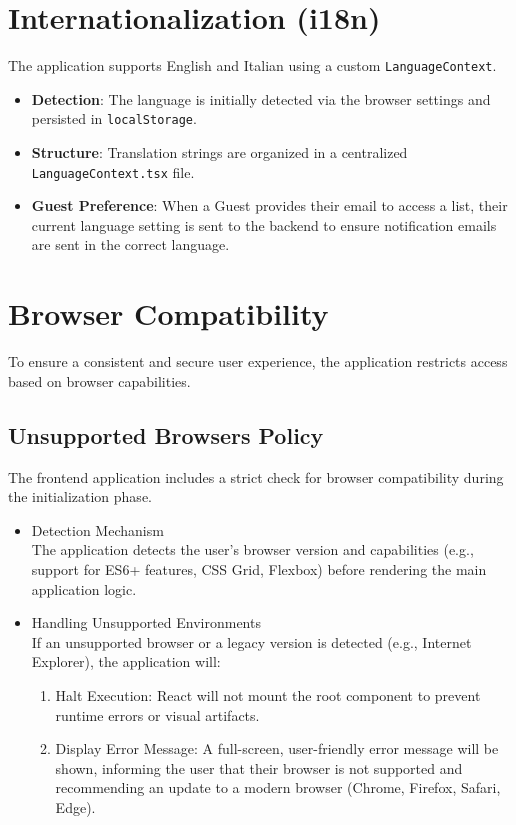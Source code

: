 \section{Internationalization (i18n)}
The application supports English and Italian using a custom \texttt{LanguageContext}.
\begin{itemize}
    \item \textbf{Detection}: The language is initially detected via the browser settings and persisted in \texttt{localStorage}.
    \item \textbf{Structure}: Translation strings are organized in a centralized \texttt{LanguageContext.tsx} file.
    \item \textbf{Guest Preference}: When a Guest provides their email to access a list, their current language setting is sent to the backend to ensure notification emails are sent in the correct language.
\end{itemize}

\section{Browser Compatibility}
To ensure a consistent and secure user experience, the application restricts access based on browser capabilities.

\subsection{Unsupported Browsers Policy}
The frontend application includes a strict check for browser compatibility during the initialization phase.
\begin{itemize}
    \item Detection Mechanism \\
        The application detects the user's browser version and capabilities (e.g., support for ES6+ features, CSS Grid, Flexbox) before rendering the main application logic.
    \item Handling Unsupported Environments \\
        If an unsupported browser or a legacy version is detected (e.g., Internet Explorer), the application will:
    \begin{enumerate}
        \item Halt Execution: React will not mount the root component to prevent runtime errors or visual artifacts.
        \item Display Error Message: A full-screen, user-friendly error message will be shown, informing the user that their browser is not supported and recommending an update to a modern browser (Chrome, Firefox, Safari, Edge).
    \end{enumerate}
\end{itemize}

